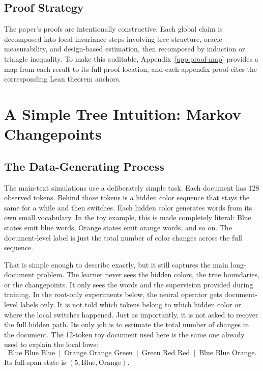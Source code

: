 \documentclass[11pt]{article}
\begin{document}
\subsection{Proof Strategy}

The paper's proofs are intentionally constructive. Each global claim is decomposed into local invariance steps involving tree structure, oracle measurability, and design-based estimation, then recomposed by induction or triangle inequality. To make this auditable, Appendix~\ref{app:proof-map} provides a map from each result to its full proof location, and each appendix proof cites the corresponding Lean theorem anchors.

\section{A Simple Tree Intuition: Markov Changepoints}\label{sec:markov-intuition}

\subsection{The Data-Generating Process}

The main-text simulations use a deliberately simple task. Each document has 128 observed tokens. Behind those tokens is a hidden color sequence that stays the same for a while and then switches. Each hidden color generates words from its own small vocabulary. In the toy example, this is made completely literal: Blue states emit blue words, Orange states emit orange words, and so on. The document-level label is just the total number of color changes across the full sequence.

That is simple enough to describe exactly, but it still captures the main long-document problem. The learner never sees the hidden colors, the true boundaries, or the changepoints. It only sees the words and the supervision provided during training. In the root-only experiments below, the neural operator gets document-level labels only. It is not told which tokens belong to which hidden color or where the local switches happened. Just as importantly, it is not asked to recover the full hidden path. Its only job is to estimate the total number of changes in the document. The 12-token toy document used here is the same one already used to explain the local laws:
\[
\text{Blue Blue Blue}\ \mid\ \text{Orange Orange Green}\ \mid\ \text{Green Red Red}\ \mid\ \text{Blue Blue Orange}.
\]
Its full-span state is $(5,\text{Blue},\text{Orange})$.
\end{document}
